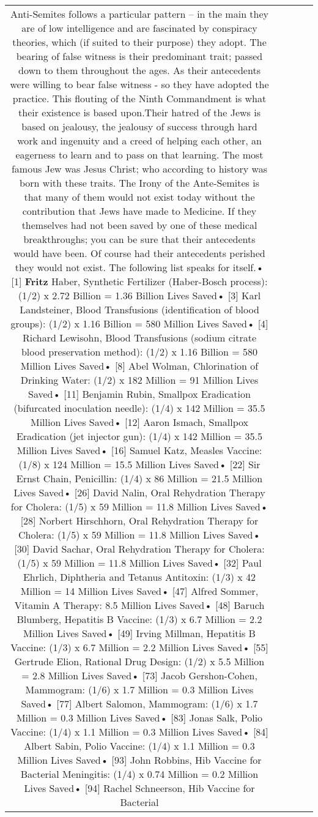\documentclass[11pt]{article}
\newlength\mylength
\begin{document}
\begin{center}
\begin{longtable}{|C{.65\mylength}|C{.30\mylength}|C{.12\mylength}|C{.12\mylength}|C{.12\mylength}|}
  \small Anti-Semites follows a particular pattern – in the main they are of low intelligence and are fascinated by conspiracy theories, which (if suited to their purpose) they adopt. The bearing of false witness is their predominant trait; passed down to them throughout the ages. As their antecedents were willing to bear false witness - so they have adopted the practice. This flouting of the Ninth Commandment is what their existence is based upon.Their hatred of the Jews is based on jealousy, the jealousy of success through hard work and ingenuity and a creed of helping each other, an eagerness to learn and to pass on that learning. The most famous Jew was Jesus Christ; who according to history was born with these traits. The Irony of the Ante-Semites is that many of them would not exist today without the contribution that Jews have made to Medicine. If they themselves had not been saved by one of these medical breakthroughs; you can be sure that their antecedents would have been. Of course had their antecedents perished they would not exist.  The following list speaks for itself.• [1] \textbf{Fritz} Haber, Synthetic Fertilizer (Haber-Bosch process): (1/2) x 2.72 Billion = 1.36 Billion Lives Saved• [3] Karl Landsteiner, Blood Transfusions (identification of blood groups): (1/2) x 1.16 Billion = 580 Million Lives Saved• [4] Richard Lewisohn, Blood Transfusions (sodium citrate blood preservation method): (1/2) x 1.16 Billion = 580 Million Lives Saved• [8] Abel Wolman, Chlorination of Drinking Water: (1/2) x 182 Million = 91 Million Lives Saved• [11] Benjamin Rubin, Smallpox Eradication (bifurcated inoculation needle): (1/4) x 142 Million = 35.5 Million Lives Saved• [12] Aaron Ismach, Smallpox Eradication (jet injector gun): (1/4) x 142 Million = 35.5 Million Lives Saved• [16] Samuel Katz, Measles Vaccine: (1/8) x 124 Million = 15.5 Million Lives Saved• [22] Sir Ernst Chain, Penicillin: (1/4) x 86 Million = 21.5 Million Lives Saved• [26] David Nalin, Oral Rehydration Therapy for Cholera: (1/5) x 59 Million = 11.8 Million Lives Saved• [28] Norbert Hirschhorn, Oral Rehydration Therapy for Cholera: (1/5) x 59 Million = 11.8 Million Lives Saved• [30] David Sachar, Oral Rehydration Therapy for Cholera: (1/5) x 59 Million = 11.8 Million Lives Saved• [32] Paul Ehrlich, Diphtheria and Tetanus Antitoxin: (1/3) x 42 Million = 14 Million Lives Saved• [47] Alfred Sommer, Vitamin A Therapy: 8.5 Million Lives Saved• [48] Baruch Blumberg, Hepatitis B Vaccine: (1/3) x 6.7 Million = 2.2 Million Lives Saved• [49] Irving Millman, Hepatitis B Vaccine: (1/3) x 6.7 Million = 2.2 Million Lives Saved• [55] Gertrude Elion, Rational Drug Design: (1/2) x 5.5 Million = 2.8 Million Lives Saved• [73] Jacob Gershon-Cohen, Mammogram: (1/6) x 1.7 Million = 0.3 Million Lives Saved• [77] Albert Salomon, Mammogram: (1/6) x 1.7 Million = 0.3 Million Lives Saved• [83] Jonas Salk, Polio Vaccine: (1/4) x 1.1 Million = 0.3 Million Lives Saved• [84] Albert Sabin, Polio Vaccine: (1/4) x 1.1 Million = 0.3 Million Lives Saved• [93] John Robbins, Hib Vaccine for Bacterial Meningitis:  (1/4) x 0.74 Million = 0.2 Million Lives Saved• [94] Rachel Schneerson, Hib Vaccine for Bacterial 
\end{longtable}
\end{center}
\end{document}
